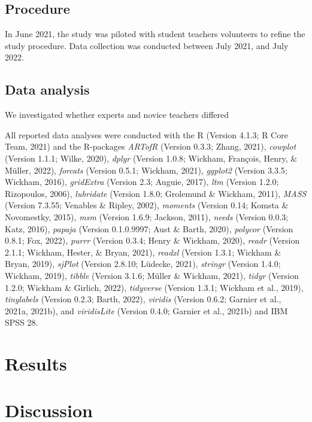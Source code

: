\documentclass[
  man,floatsintext]{apa6}
\begin{document}
\hypertarget{procedure}{%
\subsection{Procedure}\label{procedure}}

In June 2021, the study was piloted with student teachers volunteers to refine the study procedure. Data collection was conducted between July 2021, and July 2022.

\hypertarget{data-analysis}{%
\subsection{Data analysis}\label{data-analysis}}

We investigated whether experts and novice teachers differed

All reported data analyses were conducted with the R (Version 4.1.3; R Core Team, 2021) and the R-packages \emph{ARTofR} (Version 0.3.3; Zhang, 2021), \emph{cowplot} (Version 1.1.1; Wilke, 2020), \emph{dplyr} (Version 1.0.8; Wickham, François, Henry, \& Müller, 2022), \emph{forcats} (Version 0.5.1; Wickham, 2021), \emph{ggplot2} (Version 3.3.5; Wickham, 2016), \emph{gridExtra} (Version 2.3; Auguie, 2017), \emph{ltm} (Version 1.2.0; Rizopoulos, 2006), \emph{lubridate} (Version 1.8.0; Grolemund \& Wickham, 2011), \emph{MASS} (Version 7.3.55; Venables \& Ripley, 2002), \emph{moments} (Version 0.14; Komsta \& Novomestky, 2015), \emph{msm} (Version 1.6.9; Jackson, 2011), \emph{needs} (Version 0.0.3; Katz, 2016), \emph{papaja} (Version 0.1.0.9997; Aust \& Barth, 2020), \emph{polycor} (Version 0.8.1; Fox, 2022), \emph{purrr} (Version 0.3.4; Henry \& Wickham, 2020), \emph{readr} (Version 2.1.1; Wickham, Hester, \& Bryan, 2021), \emph{readxl} (Version 1.3.1; Wickham \& Bryan, 2019), \emph{sjPlot} (Version 2.8.10; Lüdecke, 2021), \emph{stringr} (Version 1.4.0; Wickham, 2019), \emph{tibble} (Version 3.1.6; Müller \& Wickham, 2021), \emph{tidyr} (Version 1.2.0; Wickham \& Girlich, 2022), \emph{tidyverse} (Version 1.3.1; Wickham et al., 2019), \emph{tinylabels} (Version 0.2.3; Barth, 2022), \emph{viridis} (Version 0.6.2; Garnier et al., 2021a, 2021b), and \emph{viridisLite} (Version 0.4.0; Garnier et al., 2021b) and IBM SPSS 28.

\hypertarget{results}{%
\section{Results}\label{results}}

\hypertarget{discussion}{%
\section{Discussion}\label{discussion}}
\end{document}
